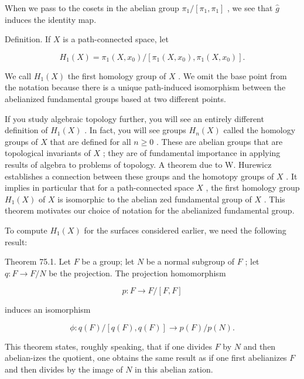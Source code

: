 \documentclass[10pt]{article}
\begin{document}
When we pass to the cosets in the abelian group \({\pi }_{1}/\left\lbrack  {{\pi }_{1},{\pi }_{1}}\right\rbrack\) , we see that \(\widehat{g}\) induces the identity map.

Definition. If \(X\) is a path-connected space, let

\[
{H}_{1}\left( X\right)  = {\pi }_{1}\left( {X,{x}_{0}}\right) /\left\lbrack  {{\pi }_{1}\left( {X,{x}_{0}}\right) ,{\pi }_{1}\left( {X,{x}_{0}}\right) }\right\rbrack  .
\]

We call \({H}_{1}\left( X\right)\) the first homology group of \(X\) . We omit the base point from the notation because there is a unique path-induced isomorphism between the abelianized fundamental groups based at two different points.

If you study algebraic topology further, you will see an entirely different definition of \({H}_{1}\left( X\right)\) . In fact, you will see groups \({H}_{n}\left( X\right)\) called the homology groups of \(X\) that are defined for all \(n \geq  0\) . These are abelian groups that are topological invariants of \(X\) ; they are of fundamental importance in applying results of algebra to problems of topology. A theorem due to W. Hurewicz establishes a connection between these groups and the homotopy groups of \(X\) . It implies in particular that for a path-connected space \(X\) , the first homology group \({H}_{1}\left( X\right)\) of \(X\) is isomorphic to the abelian zed fundamental group of \(X\) . This theorem motivates our choice of notation for the abelianized fundamental group.

To compute \({H}_{1}\left( X\right)\) for the surfaces considered earlier, we need the following result:

Theorem 75.1. Let \(F\) be a group; let \(N\) be a normal subgroup of \(F\) ; let \(q : F \rightarrow  F/N\) be the projection. The projection homomorphism

\[
p : F \rightarrow  F/\left\lbrack  {F,F}\right\rbrack
\]

induces an isomorphism

\[
\phi  : q\left( F\right) /\left\lbrack  {q\left( F\right) ,q\left( F\right) }\right\rbrack   \rightarrow  p\left( F\right) /p\left( N\right) .
\]

This theorem states, roughly speaking, that if one divides \(F\) by \(N\) and then abelian-izes the quotient, one obtains the same result as if one first abelianizes \(F\) and then divides by the image of \(N\) in this abelian zation.
\end{document}
